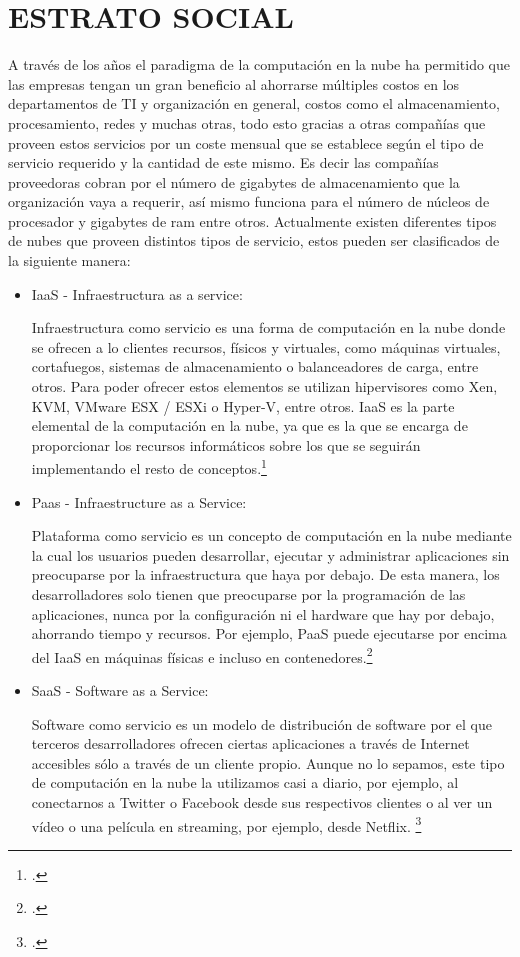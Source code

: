 	\section{ESTRATO SOCIAL}
    A través de los años el paradigma de la computación en la nube ha permitido que las empresas tengan un gran beneficio al ahorrarse múltiples costos en los departamentos de TI y organización en general, costos como el almacenamiento, procesamiento, redes y muchas otras, todo esto gracias a otras compañías que proveen estos servicios por un coste mensual que se establece según el tipo de servicio requerido y la cantidad de este mismo. Es decir las compañías proveedoras cobran por el número de gigabytes de almacenamiento que la organización vaya a requerir, así mismo funciona para el número de núcleos de procesador y gigabytes de ram entre otros. Actualmente existen diferentes tipos de nubes que proveen distintos tipos de servicio, estos pueden ser clasificados de la siguiente manera:
    \begin{itemize}
    \item IaaS - Infraestructura as a service:
    
    Infraestructura como servicio es una forma de computación en la nube donde se ofrecen a lo clientes recursos, físicos y virtuales, como máquinas virtuales, cortafuegos, sistemas de almacenamiento o balanceadores de carga, entre otros. Para poder ofrecer estos elementos se utilizan hipervisores como Xen, KVM, VMware ESX / ESXi o Hyper-V, entre otros. IaaS es la parte elemental de la computación en la nube, ya que es la que se encarga de proporcionar los recursos informáticos sobre los que se seguirán implementando el resto de conceptos.\footcite[][]{IaaS}

	\item Paas - Infraestructure as a Service:

Plataforma como servicio es un concepto de computación en la nube mediante la cual los usuarios pueden desarrollar, ejecutar y administrar aplicaciones sin preocuparse por la infraestructura que haya por debajo. De esta manera, los desarrolladores solo tienen que preocuparse por la programación de las aplicaciones, nunca por la configuración ni el hardware que hay por debajo, ahorrando tiempo y recursos. Por ejemplo, PaaS puede ejecutarse por encima del IaaS en máquinas físicas e incluso en contenedores.\footcite[][]{IaaS}

	\item SaaS - Software as a Service:

Software como servicio es un modelo de distribución de software por el que terceros desarrolladores ofrecen ciertas aplicaciones a través de Internet accesibles sólo a través de un cliente propio. Aunque no lo sepamos, este tipo de computación en la nube la utilizamos casi a diario, por ejemplo, al conectarnos a Twitter o Facebook desde sus respectivos clientes o al ver un vídeo o una película en streaming, por ejemplo, desde Netflix. \footcite[][]{IaaS}
    \end{itemize}
    

